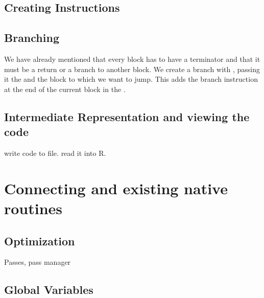 \documentclass[article]{jss}
\begin{document}



\subsection{Creating Instructions}



\subsection{Branching}
We have already mentioned that every block has to have a terminator
and that it must be a return or a branch to another block.  We create
a branch with , passing it the 
and the block to which we want to jump. This adds the branch
instruction at the end of the current block in the .


\subsection{Intermediate Representation and viewing the code}


write code to file.
read it into R.





\section[Connecting LLVM and existing native routines]{Connecting \llvm{} and existing native routines}

\subsection{Optimization}
Passes, pass manager



\subsection{Global Variables}
\end{document}
